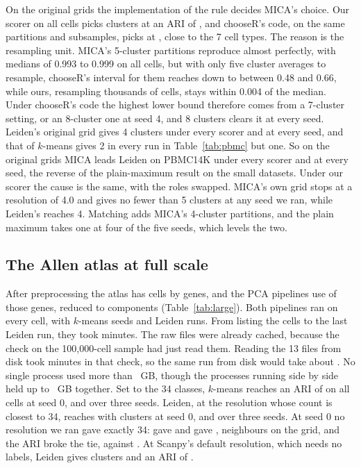 On the original grids the implementation of the rule decides MICA's choice. Our scorer on all cells picks
 clusters at an ARI of , and chooseR's code, on the
same partitions and subsamples, picks  at , close
to the 7 cell types. The reason is the resampling unit. MICA's 5-cluster partitions reproduce almost
perfectly, with medians of 0.993 to 0.999 on all cells, but with only five cluster averages to resample,
chooseR's interval for them reaches down to between 0.48 and 0.66, while ours, resampling thousands of
cells, stays within 0.004 of the median. Under chooseR's code the highest lower bound therefore comes from
a 7-cluster setting, or an 8-cluster one at seed 4, and 8 clusters clears it at every seed. Leiden's original
grid gives 4 clusters under every scorer and at every seed, and that of $k$-means gives 2 in every run in
Table~\ref{tab:pbmc} but one.
So on the original grids MICA leads Leiden on PBMC14K under every scorer and at every seed, the reverse of the plain-maximum result on the small datasets. Under our scorer the cause is the same, with the roles swapped. MICA's own grid stops at a resolution of 4.0 and gives no fewer than 5 clusters at any seed we ran, while Leiden's reaches 4. Matching adds MICA's 4-cluster partitions, and the plain maximum takes one at four of the five seeds, which levels the two.



\subsection{The Allen atlas at full scale}\label{sec:large}
After preprocessing the atlas has  cells by  genes, and the PCA pipelines
use  of those genes, reduced to  components (Table~\ref{tab:large}). Both
pipelines ran on every cell, with  $k$-means seeds and
 Leiden runs. From listing the cells to the last Leiden run, they took  minutes. The raw files were already
cached, because the check on the 100,000-cell sample had just read them. Reading the 13 files from disk took
 minutes in that check, so the same run from disk would take about
. No single process used more than ~GB, though the
processes running side by side held up to ~GB together. Set to the 34 classes, $k$-means reaches an ARI of  on
all cells at seed 0, and  over three seeds. Leiden, at the resolution whose count
is closest to 34, reaches  with  clusters at seed 0, and
 over three seeds. At seed 0 no resolution we ran gave exactly 34:
 gave  and  gave
, neighbours on the grid, and the ARI broke the tie,  against
. At Scanpy's default resolution, which needs no labels, Leiden gives
 clusters and an ARI of .

